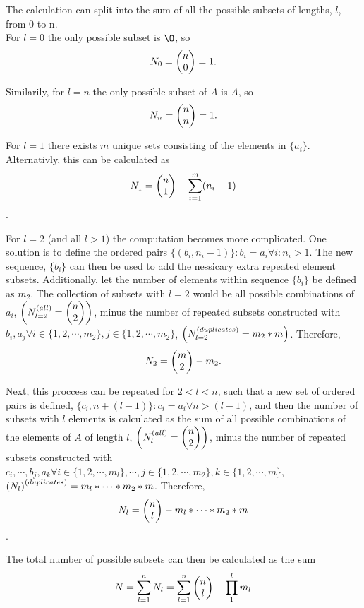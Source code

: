 \documentclass[]{article}
\begin{document}
The calculation can split into the sum of all the possible subsets of lengths, $l$,
from 0 to n.\\
For $l=0$ the only possible subset is $\O$,
so $$N_0 = \mqty(n \\ 0) = 1.$$

Similarily, for $l=n$ the only possible subset of $A$ is $A$, 
so $$N_n = \mqty(n \\ n) = 1.$$

For $l=1$ there exists $m$ unique sets consisting of the elements in $\{a_i\}$.
Alternativly, this can be calculated as
$$N_1 = \mqty(n\\1) - \sum_{i=1}^m (n_i - 1)$$.

For $l=2$ (and all $l>1$) the computation becomes more complicated.
One solution is to define the ordered pairs 
$\{(b_i,n_i-1)\}: b_i = a_i \forall i : n_i > 1$. 
The new sequence, $\{b_i\}$ can then be used to add the nessicary 
extra repeated element subsets. 
Additionally, let the number of elements within sequence $\{b_i\}$ 
be defined as $m_2$. 
The collection of subsets with $l=2$ would be all possible combinations of
$a_i$, $\qty(N_{l=2}^{(all)} = \mqty(n\\2))$, minus the number of repeated
subsets constructed with ${b_i,a_j} \forall i \in \{1,2,\cdots,m_2\}, 
j \in \{1,2,\cdots,m_2\}$, $\qty(N_{l=2}^{(duplicates)} = m_2 * m)$. Therefore,
$$N_2 = \mqty(m\\2) - m_2.$$

Next, this proccess can be repeated for $2 < l < n$, such that a new set of
ordered pairs is defined, $\{c_i, n + (l-1)\} : c_i = a_i \forall n > (l-1)$,
and then the number of subsets with $l$ elements is calculated as
the sum of all possible combinations of the elements of $A$ of length $l$, 
$\qty(N_{l}^{(all)} = \mqty(n\\2))$, minus the number of repeated subsets
constructed with ${c_i,\cdots,b_j,a_k} \forall i \in \{1,2,\cdots,m_l\},
\cdots, j \in \{1,2,\cdots,m_2\}, k \in \{1,2,\cdots,m\}$, 
$\qty(N_l)^{(duplicates)} = m_l * \cdots * m_2 * m$. Therefore,
$$N_l = \mqty(n\\l) - m_l * \cdots * m_2 * m$$.

The total number of possible subsets can then be calculated as the sum
$$N = \sum_{l=1}^{n} N_l = \sum_{l=1}^n \mqty(n\\l) - \prod_{1}^{l} m_l$$

\end{document}

